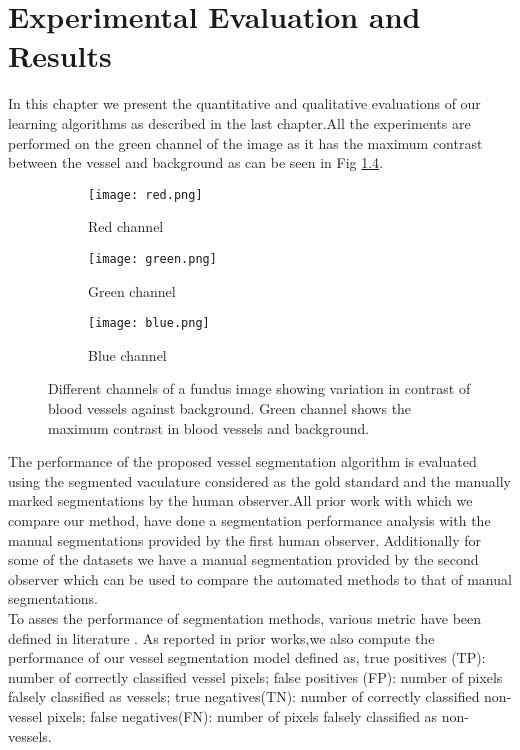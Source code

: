 \chapter{Experimental Evaluation and Results}  %

\ifpdf
\graphicspath{{Chapter4/Figs/Raster/}{Chapter4/Figs/PDF/}{Chapter4/Figs/}}
\else
\graphicspath{{Chapter4/Figs/Vector/}{Chapter4/Figs/}}
\fi

In this chapter we present the quantitative and qualitative evaluations of our learning algorithms as described in the last chapter.All the experiments are performed on the green channel of the image as it has the maximum contrast between the vessel and background as can be seen in Fig \ref{fig:fundus image}.\\
\begin{figure}
	\begin{subfigure}[b]{0.3\textwidth}
		\texttt{[image: red.png]}
		\caption{Red channel}
		\label{fig:red fundus}
	\end{subfigure}
	\begin{subfigure}[b]{0.3\textwidth}
		\texttt{[image: green.png]}
		\caption{Green channel}
		\label{fig:green fundus}
	\end{subfigure}
	\begin{subfigure}[b]{0.3\textwidth}
		\texttt{[image: blue.png]}
		\caption{Blue channel}
		\label{fig:blue fundus}
	\end{subfigure}
	\caption[Red, Green, Blue channels of a fundus image]{Different channels of a fundus image showing variation in contrast of blood vessels against background. Green channel shows the maximum contrast in blood vessels and background.}
	\label{fig:fundus image}
\end{figure}

The performance of the proposed vessel segmentation algorithm is evaluated using the segmented vaculature considered as the gold standard and the manually marked segmentations by the human observer.All prior work with which we compare our method, have done a segmentation performance analysis with the manual segmentations provided by the first human observer. Additionally for some of the datasets we have a manual segmentation provided by the second observer which can be used to compare the automated methods to that of manual segmentations.\\

To asses the performance of segmentation methods, various metric have been defined in literature \cite{monteiro2006performance,sharma2001performance}. As reported in prior works,we also compute the performance of our vessel segmentation model defined as, true positives (TP): number of correctly classified vessel pixels; false positives (FP): number of pixels falsely classified as vessels; true negatives(TN): number of correctly classified non-vessel pixels; false negatives(FN): number of pixels falsely classified as non-vessels.\\

